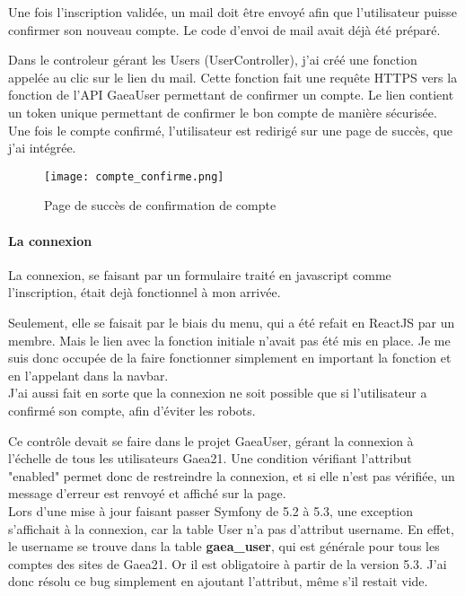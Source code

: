 Une fois l'inscription validée, un mail doit être envoyé afin que l'utilisateur puisse confirmer son nouveau compte. Le code d'envoi de mail avait déjà été préparé.

Dans le controleur gérant les Users (UserController), j'ai créé une fonction appelée au clic sur le lien du mail.
Cette fonction fait une requête HTTPS vers la fonction de l'API GaeaUser permettant de confirmer un compte. Le lien contient un token unique permettant de confirmer le bon compte de manière sécurisée.
Une fois le compte confirmé, l'utilisateur est redirigé sur une page de succès, que j'ai intégrée.

\begin{figure}[H]
    \texttt{[image: compte\_confirme.png]}
    \caption{Page de succès de confirmation de compte}
\end{figure}


\paragraph{La connexion}

La connexion, se faisant par un formulaire traité en javascript comme l'inscription, était dejà fonctionnel à mon arrivée.

Seulement, elle se faisait par le biais du menu, qui a été refait en ReactJS par un membre. Mais le lien avec la fonction initiale n'avait pas été mis en place.
Je me suis donc occupée de la faire fonctionner simplement en important la fonction et en l'appelant dans la navbar.\\

J'ai aussi fait en sorte que la connexion ne soit possible que si l'utilisateur a confirmé son compte, afin d'éviter les robots.

Ce contrôle devait se faire dans le projet GaeaUser, gérant la connexion à l'échelle de tous les utilisateurs Gaea21. 
Une condition vérifiant l'attribut "enabled" permet donc de restreindre la connexion, et si elle n'est pas vérifiée, un message d'erreur est renvoyé et affiché sur la page. \\

Lors d'une mise à jour faisant passer Symfony de 5.2 à 5.3, une exception s'affichait à la connexion, car la table User n'a pas d'attribut username. En effet, le username se trouve dans la table \textbf{gaea\_user}, qui est générale pour tous les comptes des sites de Gaea21.
Or il est obligatoire à partir de la version 5.3. J'ai donc résolu ce bug simplement en ajoutant l'attribut, même s'il restait vide.


